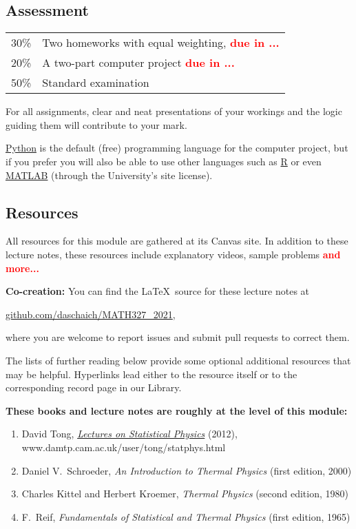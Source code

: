 \documentclass[12 pt]{article}
\newcommand{\mutesubsection}[1]{\vspace{-\medskipamount}\subsection*{#1}\vspace{-\medskipamount}}
\newcommand{\TODO}[1]{\textcolor{red}{\textbf{#1}}}
\begin{document}
\mutesubsection{Assessment}
\begin{tabular}{ll}
  30\% & Two homeworks with equal weighting, \TODO{due in ...} \\
  20\% & A two-part computer project \TODO{due in ...} \\
  50\% & Standard examination \\
\end{tabular}

For all assignments, clear and neat presentations of your workings and the logic guiding them will contribute to your mark.

\href{https://www.python.org}{Python} is the default (free) programming language for the computer project, but if you prefer you will also be able to use other languages such as \href{https://www.r-project.org}{R} or even \href{https://matlab.mathworks.com}{MATLAB} (through the University's site license).

\mutesubsection{Resources}
All resources for this module are gathered at its Canvas site.
In addition to these lecture notes, these resources include explanatory videos, sample problems \TODO{and more...}

\textbf{Co-creation:} You can find the \LaTeX\ source for these lecture notes at \\
\centerline{\href{https://github.com/daschaich/MATH327_2021}{github.com/daschaich/MATH327\_2021},}
where you are welcome to report issues and submit pull requests to correct them.

The lists of further reading below provide some optional additional resources that may be helpful.
Hyperlinks lead either to the resource itself or to the corresponding record page in our Library.

\noindent\textbf{These books and lecture notes are roughly at the level of this module:} \\[-24 pt]
\begin{enumerate}
  \item David Tong, \href{https://www.damtp.cam.ac.uk/user/tong/statphys.html}{\textit{Lectures on Statistical Physics}} (2012), \\ www.damtp.cam.ac.uk/user/tong/statphys.html
  \item Daniel V.~Schroeder, \textit{An Introduction to Thermal Physics} (first edition, 2000)
  \item Charles Kittel and Herbert Kroemer, \textit{Thermal Physics} (second edition, 1980)
  \item F.~Reif, \textit{Fundamentals of Statistical and Thermal Physics} (first edition, 1965)
\end{enumerate}
\end{document}
